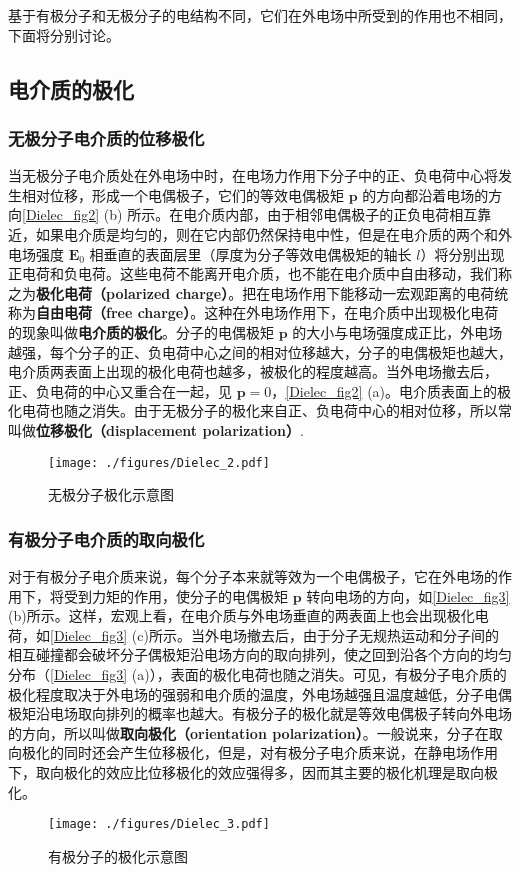 基于有极分子和无极分子的电结构不同，它们在外电场中所受到的作用也不相同，下面将分别讨论。

\subsection{电介质的极化}

\subsubsection{无极分子电介质的位移极化}

当无极分子电介质处在外电场中时，在电场力作用下分子中的正、负电荷中心将发生相对位移，形成一个电偶极子，它们的等效电偶极矩 $\mathbf p$ 的方向都沿着电场的方向\autoref{Dielec_fig2} (b) 所示。在电介质内部，由于相邻电偶极子的正负电荷相互靠近，如果电介质是均匀的，则在它内部仍然保持电中性，但是在电介质的两个和外电场强度 $\mathbf E_0$ 相垂直的表面层里（厚度为分子等效电偶极矩的轴长 $l$）将分别出现正电荷和负电荷。这些电荷不能离开电介质，也不能在电介质中自由移动，我们称之为\textbf{极化电荷（polarized charge）}。把在电场作用下能移动一宏观距离的电荷统称为\textbf{自由电荷（free charge）}。这种在外电场作用下，在电介质中出现极化电荷的现象叫做\textbf{电介质的极化}。分子的电偶极矩 $\mathbf p $ 的大小与电场强度成正比，外电场越强，每个分子的正、负电荷中心之间的相对位移越大，分子的电偶极矩也越大，电介质两表面上出现的极化电荷也越多，被极化的程度越高。当外电场撤去后，正、负电荷的中心又重合在一起，见 $\mathbf p=0$，\autoref{Dielec_fig2} (a)。电介质表面上的极化电荷也随之消失。由于无极分子的极化来自正、负电荷中心的相对位移，所以常叫做\textbf{位移极化（displacement polarization）}.
\begin{figure}[ht]
\centering
\texttt{[image: ./figures/Dielec\_2.pdf]}
\caption{无极分子极化示意图} \label{Dielec_fig2}
\end{figure}

\subsubsection{有极分子电介质的取向极化}

对于有极分子电介质来说，每个分子本来就等效为一个电偶极子，它在外电场的作用下，将受到力矩的作用，使分子的电偶极矩 $\mathbf p$ 转向电场的方向，如\autoref{Dielec_fig3} (b)所示。这样，宏观上看，在电介质与外电场垂直的两表面上也会出现极化电荷，如\autoref{Dielec_fig3} (c)所示。当外电场撤去后，由于分子无规热运动和分子间的相互碰撞都会破坏分子偶极矩沿电场方向的取向排列，使之回到沿各个方向的均匀分布（\autoref{Dielec_fig3} (a)），表面的极化电荷也随之消失。可见，有极分子电介质的极化程度取决于外电场的强弱和电介质的温度，外电场越强且温度越低，分子电偶极矩沿电场取向排列的概率也越大。有极分子的极化就是等效电偶极子转向外电场的方向，所以叫做\textbf{取向极化（orientation polarization）}。一般说来，分子在取向极化的同时还会产生位移极化，但是，对有极分子电介质来说，在静电场作用下，取向极化的效应比位移极化的效应强得多，因而其主要的极化机理是取向极化。
\begin{figure}[ht]
\centering
\texttt{[image: ./figures/Dielec\_3.pdf]}
\caption{有极分子的极化示意图} \label{Dielec_fig3}
\end{figure}

